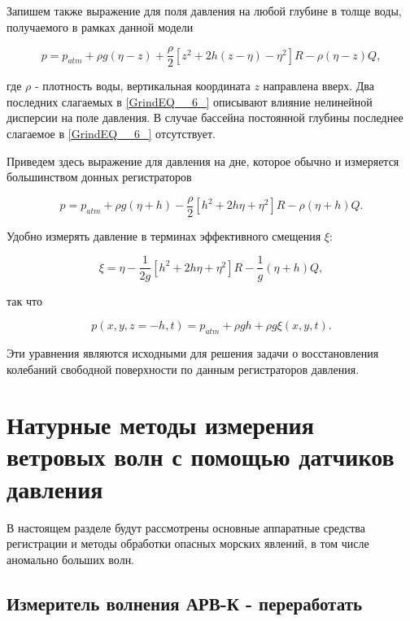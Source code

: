  Запишем также выражение для поля давления на любой глубине в толще воды, получаемого в рамках данной модели \cite{Zhel_1985}\cite{Zhel_Pel_1985}


\begin{equation} \label{GrindEQ__6_}
p=p_{atm} +\rho g(\eta -z)+\frac{\rho }{2} \left[z^{2} +2h(z-\eta )-\eta ^{2} \right]R-\rho (\eta -z)Q,
\end{equation}


 где $\rho$ - плотность воды, вертикальная координата $z$ направлена вверх. Два последних слагаемых в \eqref{GrindEQ__6_} описывают влияние нелинейной дисперсии на поле давления. В случае бассейна постоянной глубины последнее слагаемое в \eqref{GrindEQ__6_} отсутствует.

 Приведем здесь выражение для давления на дне, которое обычно и измеряется большинством донных регистраторов

\begin{equation} \label{GrindEQ__7_}
p=p_{atm} +\rho g(\eta +h)-\frac{\rho }{2} \left[h^{2} +2h\eta +\eta ^{2} \right]R-\rho (\eta +h)Q.
\end{equation}


Удобно измерять давление в терминах эффективного смещения $\xi$:

\begin{equation} \label{GrindEQ__8_}
\xi =\eta -\frac{1}{2g} \left[h^{2} +2h\eta +\eta ^{2} \right]R-\frac{1}{g} (\eta +h)Q,
\end{equation}


так что

\begin{equation} \label{GrindEQ__9_}
p(x,y,z=-h,t)=p_{atm} +\rho gh+\rho g\xi (x,y,t).
\end{equation}


Эти уравнения являются исходными для решения задачи о восстановления колебаний свободной поверхности по данным регистраторов давления.



\section{Натурные методы измерения ветровых волн с помощью датчиков давления}
В настоящем разделе будут рассмотрены основные аппаратные средства регистрации и методы обработки опасных морских явлений, в том числе аномально больших волн.

\subsection{Измеритель волнения АРВ-К - переработать}\label{ARV}

